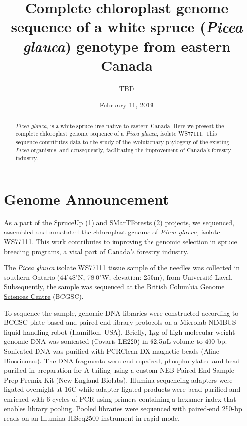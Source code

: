 \documentclass[titlepage,11pt, oneside]{article}   	%
\title{\textbf{Complete chloroplast genome sequence of a white spruce (\textit{Picea glauca}) genotype from eastern Canada}}
\author{TBD}
\date{February 11, 2019}					%
\begin{document}
\maketitle
\begin{abstract}
\textit{Picea glauca}, is a white spruce tree native to eastern Canada. Here we present the complete chloroplast genome sequence of a \textit{Picea glauca}, isolate WS77111. This sequence contributes data to the study of the evolutionary phylogeny of the existing \textit{Picea} organisms, and consequently, facilitating the improvement of Canada’s forestry industry.
\end{abstract}

\section*{Genome Announcement}
As a part of the \href{http://spruce-up.ca/en/}{SpruceUp} (1) and \href{https://www.smartforests.ca}{SMarTForests} (2) projects, we sequenced, assembled and annotated the chloroplast genome of \textit{Picea glauca}, isolate WS77111. This work contributes to improving the genomic selection in spruce breeding programs, a vital part of Canada’s forestry industry.
\newline
\par
The \textit{Picea glauca} isolate WS77111 tissue sample of the needles was collected in southern Ontario (44'48"N, 78'0"W; elevation: 250m), from Universit\'{e} Laval. Subsequently, the sample was sequenced at the \href{http://www.bcgsc.ca}{British Columbia Genome Sciences Centre} (BCGSC).
\newline
\par
To sequence the sample, genomic DNA libraries were constructed according to BCGSC plate-based and paired-end library protocols on a Microlab NIMBUS liquid handling robot (Hamilton, USA). Briefly, 1$\mu$g of high molecular weight genomic DNA was sonicated (Covaris LE220) in 62.5$\mu$L volume to 400-bp. Sonicated DNA was purified with PCRClean DX magnetic beads (Aline Biosciences). The DNA fragments were end-repaired, phosphorylated and bead-purified in preparation for A-tailing using a custom NEB Paired-End Sample Prep Premix Kit (New England Biolabs). Illumina sequencing adapters were ligated overnight at 16\degree C while adapter ligated products were bead purified and enriched with 6 cycles of PCR using primers containing a hexamer index that enables library pooling. Pooled libraries were sequenced with paired-end 250-bp reads on an Illumina HiSeq2500 instrument in rapid mode.
\end{document}
